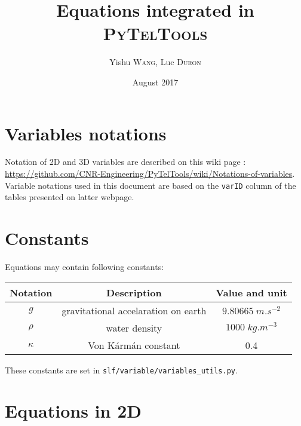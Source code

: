 \documentclass{article}
\title{Equations integrated in \textsc{PyTelTools}}
\author{Yishu \textsc{Wang}, Luc \textsc{Duron}}
\date{August 2017}
\begin{document}
\shorthandoff{:}

\maketitle
\small
\tableofcontents\newpage
\printindex
\normalsize

\section{Variables notations}

Notation of 2D and 3D variables are described on this wiki page : \url{https://github.com/CNR-Engineering/PyTelTools/wiki/Notations-of-variables}.
Variable notations used in this document are based on the \texttt{varID} column of the tables presented on latter webpage.

\section{Constants}

Equations may contain following constants:

\begin{center}
  \begin{tabular}{ | c | c | c | }
    \hline
    Notation  & Description & Value and unit \\
    \hline
    $g$      & gravitational accelaration on earth & $9.80665 \; m.s^{-2}$ \\
    $\rho$   & water density                       & $1000 \; kg.m^{-3}$ \\
    $\kappa$ & Von Kármán constant                 & 0.4 \\
    \hline
  \end{tabular}
\end{center}

These constants are set in \texttt{slf/variable/variables\_utils.py}.

\section{Equations in 2D}
\end{document}
